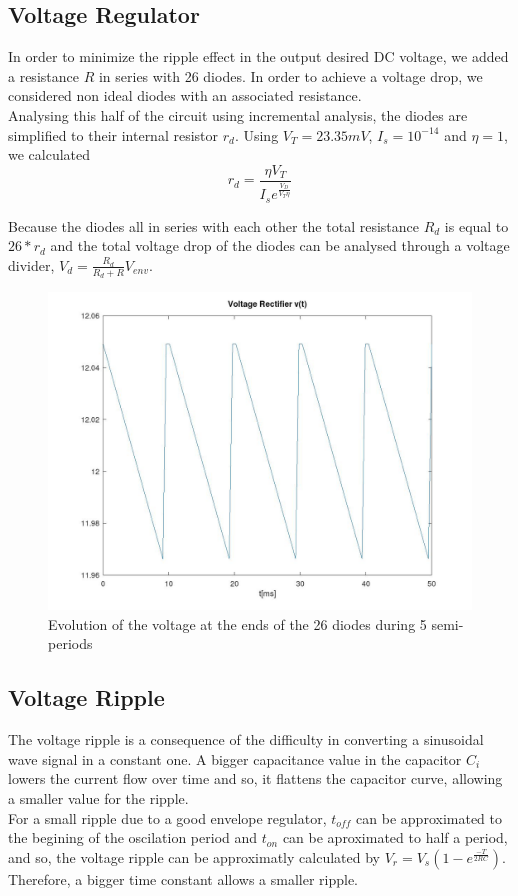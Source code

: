 \subsection{Voltage Regulator}
In order to minimize the ripple effect in the output desired DC voltage, we added a resistance $R$
in series with 26 diodes. In order to achieve a voltage drop, we considered non ideal diodes 
with an associated resistance. \\
Analysing this half of the circuit using incremental analysis, the diodes are simplified to their internal
resistor $r_d$. Using $V_T = 23.35 mV$, $I_s = 10^{-14}$ and $\eta = 1$, we calculated
\begin{equation}
r_d = \frac{\eta V_T}{I_s e^{\frac{V_D}{V_T \eta}}}
\end{equation}

Because the diodes all in series with each other the total resistance $R_d$ is equal to $26*r_d$
and the total voltage drop of the diodes can be analysed through a voltage divider, $V_d = \frac{R_d}{R_d + R}V_{env}$.

\begin{figure}[h] 
    \centering
    \includegraphics[width=0.75\linewidth]{../mat/voltage_rectifier.jpg}
    \caption{Evolution of the voltage at the ends of the 26 diodes during 5 semi-periods}
    \label{fig:Voltage Rectifier}
\end{figure}

\subsection{Voltage Ripple}
\label{subsec:2}

The voltage ripple is a consequence of the difficulty in converting a sinusoidal wave signal in a constant one. A 
bigger capacitance value in the capacitor $C_i$ lowers the current flow over time and so, it flattens the capacitor curve,
 allowing a smaller value for the ripple. \\
For a small ripple due to a good envelope regulator, $t_{off}$ can be approximated to the begining of the oscilation period and 
$t_{on}$ can be aproximated to half a period, and so, the voltage ripple can be approximatly calculated by $V_r = V_s (1-e^{\frac{-T}{2RC}})$.
Therefore, a bigger time constant allows a smaller ripple.

